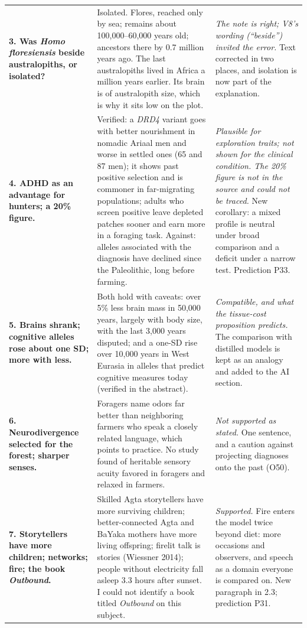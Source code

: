 \documentclass[10pt,letterpaper]{extarticle}
\newcommand{\lab}[1]{\textbf{#1}}
\begin{document}
{\begin{longtable}{@{}P{0.20\textwidth}P{0.42\textwidth}P{0.31\textwidth}@{}}
\lab{3. Was \textit{Homo floresiensis} beside australopiths, or isolated?} & Isolated. Flores, reached only by sea; remains about 100,000--60,000 years old; ancestors there by 0.7 million years ago. The last australopiths lived in Africa a million years earlier. Its brain is of australopith size, which is why it sits low on the plot. & \emph{The note is right; V8's wording (``beside'') invited the error.} Text corrected in two places, and isolation is now part of the explanation.\\
\lab{4. ADHD as an advantage for hunters; a 20\% figure.} & Verified: a \textit{DRD4} variant goes with better nourishment in nomadic Ariaal men and worse in settled ones (65 and 87 men); it shows past positive selection and is commoner in far-migrating populations; adults who screen positive leave depleted patches sooner and earn more in a foraging task. Against: alleles associated with the diagnosis have declined since the Paleolithic, long before farming. & \emph{Plausible for exploration traits; not shown for the clinical condition. The 20\% figure is not in the source and could not be traced.} New corollary: a mixed profile is neutral under broad comparison and a deficit under a narrow test. Prediction P33.\\
\lab{5. Brains shrank; cognitive alleles rose about one SD; more with less.} & Both hold with caveats: over 5\% less brain mass in 50,000 years, largely with body size, with the last 3,000 years disputed; and a one-SD rise over 10,000 years in West Eurasia in alleles that predict cognitive measures today (verified in the abstract). & \emph{Compatible, and what the tissue-cost proposition predicts.} The comparison with distilled models is kept as an analogy and added to the AI section.\\
\lab{6. Neurodivergence selected for the forest; sharper senses.} & Foragers name odors far better than neighboring farmers who speak a closely related language, which points to practice. No study found of heritable sensory acuity favored in foragers and relaxed in farmers. & \emph{Not supported as stated.} One sentence, and a caution against projecting diagnoses onto the past (O50).\\
\lab{7. Storytellers have more children; networks; fire; the book \emph{Outbound}.} & Skilled Agta storytellers have more surviving children; better-connected Agta and BaYaka mothers have more living offspring; firelit talk is stories (Wiessner 2014); people without electricity fall asleep 3.3 hours after sunset. I could not identify a book titled \emph{Outbound} on this subject. & \emph{Supported.} Fire enters the model twice beyond diet: more occasions and observers, and speech as a domain everyone is compared on. New paragraph in 2.3; prediction P31.\\

\end{longtable}}
\end{document}
